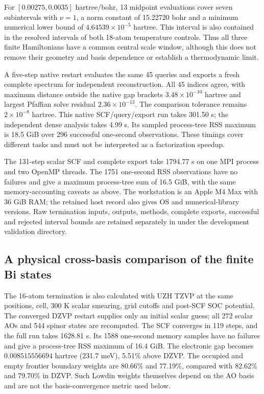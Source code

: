 \documentclass[11pt]{article}
\begin{document}
For $[0.00275,0.0035]$ hartree/bohr, 13 midpoint evaluations
cover seven subintervals with $\nu=1$, a norm constant of
15.22720 bohr and a minimum numerical lower bound of
$4.64539\times10^{-5}$ hartree. This interval is also contained
in the resolved intervals of both 18-atom temperature controls.
Thus all three finite Hamiltonians have a common central scale
window, although this does not remove their geometry and basis
dependence or establish a thermodynamic limit.

A five-step native restart evaluates the same 45 queries and
exports a fresh complete spectrum for independent reconstruction.
All 45 indices agree, with maximum distance outside the native
gap brackets $3.48\times10^{-10}$ hartree and largest Pfaffian
solve residual $2.36\times10^{-13}$. The comparison tolerance
remains $2\times10^{-8}$ hartree. This native SCF/query/export
run takes 301.50 s; the independent dense analysis takes 4.99 s.
Its sampled process-tree RSS maximum is 18.5 GiB over 296
successful one-second observations. These timings cover different
tasks and must not be interpreted as a factorization speedup.

The 131-step scalar SCF and complete export take 1794.77 s on
one MPI process and two OpenMP threads. The 1751 one-second RSS
observations have no failures and give a maximum process-tree
sum of 16.5 GiB, with the same memory-accounting caveats as above.
The workstation is an Apple M4 Max with 36 GiB RAM; the retained
host record also gives OS and numerical-library versions.
Raw termination inputs, outputs, methods, complete exports,
successful and rejected interval bounds are retained separately
in  under the development
validation directory.

\subsection{A physical cross-basis comparison of the finite Bi states}
The 16-atom termination is also calculated with UZH TZVP at the
same positions, cell, 300 K scalar smearing, grid cutoffs and
post-SCF SOC potential. The converged DZVP restart supplies only
an initial scalar guess; all 272 scalar AOs and 544 spinor states
are recomputed. The SCF converges in 119 steps, and the full run
takes 1628.81 s. Its 1588 one-second memory samples have no
failures and give a process-tree RSS maximum of 16.4 GiB.
The electronic gap becomes $0.008515556694$ hartree
(231.7 meV), 5.51\% above DZVP. The occupied and empty frontier
boundary weights are 80.66\% and 77.19\%, compared with 82.62\%
and 79.70\% in DZVP. Such Lowdin weights themselves depend on
the AO basis and are not the basis-convergence metric used below.
\end{document}
